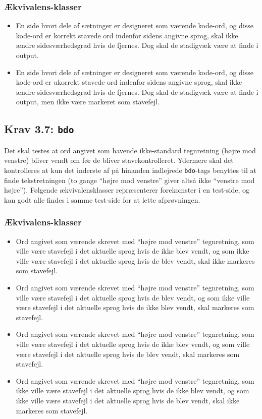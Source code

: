 \documentclass[a4paper,oneside,article]{memoir}
\begin{document}
\subsubsection{Ækvivalens-klasser}
\begin{itemize}
\item En side hvori dele af sætninger er designeret som værende
  kode-ord, og disse kode-ord er korrekt stavede ord indenfor sidens
  angivne sprog, skal ikke ændre sidesværhedsgrad hvis de fjernes. Dog
  skal de stadigvæk være at finde i output.
\item En side hvori dele af sætninger er designeret som værende
  kode-ord, og disse kode-ord er ukorrekt stavede ord indenfor sidens
  angivne sprog, skal ikke ændre sidesværhedsgrad hvis de fjernes. Dog
  skal de stadigvæk være at finde i output, men ikke være markeret som
  stavefejl.
\end{itemize}

\subsection{Krav 3.7: \texttt{bdo}}

Det skal testes at ord angivet som havende ikke-standard tegnretning
(højre mod venstre) bliver vendt om før de bliver
stavekontrolleret. Ydermere skal det kontrolleres at kun det inderste
af på hinanden indlejrede \texttt{bdo}-tags benyttes til at finde
tekstretningen (to gange ``højre mod venstre'' giver altså ikke
``venstre mod højre''). Følgende ækvivalensklasser repræsenterer
forekomster i en test-side, og kan godt alle findes i samme test-side
for at lette afprøvningen.

\subsubsection{Ækvivalens-klasser}
\begin{itemize}
\item Ord angivet som værende skrevet med ``højre mod venstre''
  tegnretning, som ville være stavefejl i det aktuelle sprog hvis de
  ikke blev vendt, og som ikke ville være stavefejl i det aktuelle
  sprog hvis de blev vendt, skal ikke markeres som stavefejl.
\item Ord angivet som værende skrevet med ``højre mod venstre''
  tegnretning, som ville være stavefejl i det aktuelle sprog hvis de
  blev vendt, og som ikke ville være stavefejl i det aktuelle sprog
  hvis de ikke blev vendt, skal markeres som stavefejl.
\item Ord angivet som værende skrevet med ``højre mod venstre''
  tegnretning, som ville være stavefejl i det aktuelle sprog hvis de
  ikke blev vendt, og som ville være stavefejl i det aktuelle sprog
  hvis de blev vendt, skal markeres som stavefejl.
\item Ord angivet som værende skrevet med ``højre mod venstre''
  tegnretning, som ikke ville være stavefejl i det aktuelle sprog hvis
  de ikke blev vendt, og som ikke ville være stavefejl i det aktuelle
  sprog hvis de blev vendt, skal ikke markeres som stavefejl.
\end{itemize}
\end{document}
